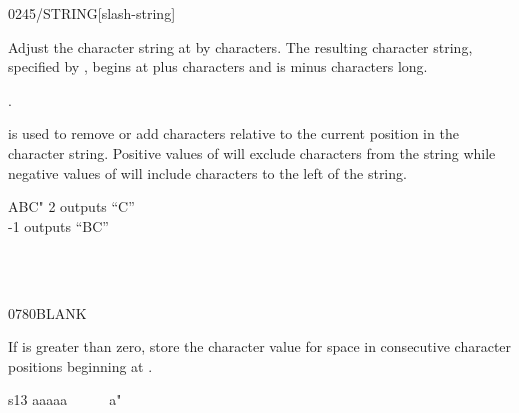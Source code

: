 \begin{worddef}{0245}{/STRING}[slash-string]
\item {}

	Adjust the character string at  by 
	characters. The resulting character string, specified by
	, begins at  plus 
	characters and is  minus  characters long.

\see {}.

	\begin{rationale} %
		 is used to remove or add characters relative
		to the current position in the character string. Positive values
		of  will exclude characters from the string while
		negative values of  will include characters to the
		left of the string.

		 ABC" 2     outputs ``C'' \\
		-1    outputs ``BC''
	\end{rationale}

	\begin{testing} %
		 \\
		 \\
	\end{testing}
\end{worddef}


\begin{worddef}{0780}{BLANK}
\item {}

	If  is greater than zero, store the character value for
	space in  consecutive character positions beginning at
	.

	\begin{testing} %
		\ttfamily
		\word{:} s13  aaaaa~~~~~~a" \word{;}						\tab[4.5]  

							\tab[2.8]   \\
			\tab[1]   \\
									\tab[2.2]  
	\end{testing}
\end{worddef}



